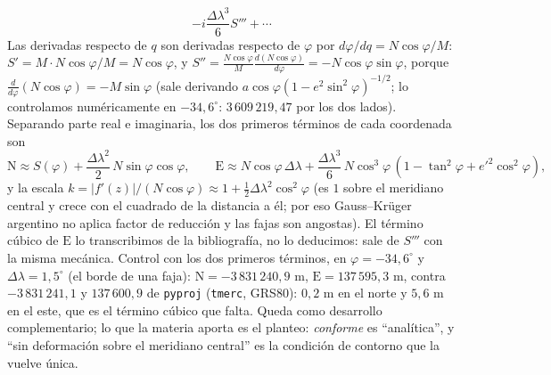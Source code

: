 \begin{enumerate}[label=(\alph*)]
\[    -i\frac{\Delta\lambda^3}6S'''+\cdots
  \]
  Las derivadas respecto de \(q\) son derivadas respecto de \(\varphi\) por
  \(d\varphi/dq=N\cos\varphi/M\): \(S'=M\cdot N\cos\varphi/M=N\cos\varphi\), y
  \(S''=\frac{N\cos\varphi}{M}\frac{d(N\cos\varphi)}{d\varphi}=-N\cos\varphi\sin\varphi\),
  porque \(\frac{d}{d\varphi}(N\cos\varphi)=-M\sin\varphi\) (sale derivando
  \(a\cos\varphi(1-e^2\sin^2\varphi)^{-1/2}\); lo controlamos numéricamente en
  \(-34{,}6^\circ\): \(3\,609\,219{,}47\) por los dos lados). Separando parte real e
  imaginaria, los dos primeros términos de cada coordenada son
  \[
    \mathrm N\approx S(\varphi)+\frac{\Delta\lambda^2}2\,N\sin\varphi\cos\varphi,\qquad
    \mathrm E\approx N\cos\varphi\,\Delta\lambda
    +\frac{\Delta\lambda^3}{6}\,N\cos^3\varphi\,(1-\tan^2\varphi+e'^2\cos^2\varphi),
  \]
  y la escala \(k=|f'(z)|/(N\cos\varphi)\approx1+\tfrac12\Delta\lambda^2\cos^2\varphi\)
  (es \(1\) sobre el meridiano central y crece con el cuadrado de la distancia a él; por
  eso Gauss--Krüger argentino no aplica factor de reducción y las fajas son angostas). El
  término cúbico de \(\mathrm E\) lo transcribimos de la bibliografía, no lo deducimos:
  sale de \(S'''\) con la misma mecánica. Control con los dos primeros términos, en
  \(\varphi=-34{,}6^\circ\) y \(\Delta\lambda=1{,}5^\circ\) (el borde de una faja):
  \(\mathrm N=-3\,831\,240{,}9\) m, \(\mathrm E=137\,595{,}3\) m, contra
  \(-3\,831\,241{,}1\) y \(137\,600{,}9\) de \texttt{pyproj} (\texttt{tmerc}, GRS80):
  \(0{,}2\) m en el norte y \(5{,}6\) m en el este, que es el término cúbico que falta.
  Queda como desarrollo complementario; lo que la materia aporta es el planteo:
  \emph{conforme} es ``analítica'', y ``sin deformación sobre el meridiano central'' es la
  condición de contorno que la vuelve única.
\end{enumerate}

